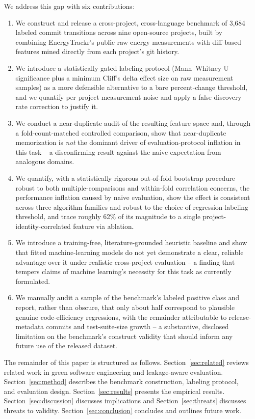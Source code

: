 \documentclass[preprint,12pt]{elsarticle}
\begin{document}
We address this gap with six contributions:
\begin{enumerate}
\item We construct and release a cross-project, cross-language benchmark of 3{,}684 labeled commit transitions across nine open-source projects, built by combining EnergyTrackr's public raw energy measurements with diff-based features mined directly from each project's git history.
\item We introduce a statistically-gated labeling protocol (Mann--Whitney U significance plus a minimum Cliff's delta effect size on raw measurement samples) as a more defensible alternative to a bare percent-change threshold, and we quantify per-project measurement noise and apply a false-discovery-rate correction to justify it.
\item We conduct a near-duplicate audit of the resulting feature space and, through a fold-count-matched controlled comparison, show that near-duplicate memorization is \emph{not} the dominant driver of evaluation-protocol inflation in this task -- a disconfirming result against the naive expectation from analogous domains.
\item We quantify, with a statistically rigorous out-of-fold bootstrap procedure robust to both multiple-comparisons and within-fold correlation concerns, the performance inflation caused by naive evaluation, show the effect is consistent across three algorithm families and robust to the choice of regression-labeling threshold, and trace roughly 62\% of its magnitude to a single project-identity-correlated feature via ablation.
\item We introduce a training-free, literature-grounded heuristic baseline and show that fitted machine-learning models do not yet demonstrate a clear, reliable advantage over it under realistic cross-project evaluation -- a finding that tempers claims of machine learning's necessity for this task as currently formulated.
\item We manually audit a sample of the benchmark's labeled positive class and report, rather than obscure, that only about half correspond to plausible genuine code-efficiency regressions, with the remainder attributable to release-metadata commits and test-suite-size growth -- a substantive, disclosed limitation on the benchmark's construct validity that should inform any future use of the released dataset.
\end{enumerate}

The remainder of this paper is structured as follows. Section~\ref{sec:related} reviews related work in green software engineering and leakage-aware evaluation. Section~\ref{sec:method} describes the benchmark construction, labeling protocol, and evaluation design. Section~\ref{sec:results} presents the empirical results. Section~\ref{sec:discussion} discusses implications and Section~\ref{sec:threats} discusses threats to validity. Section~\ref{sec:conclusion} concludes and outlines future work.
\end{document}
